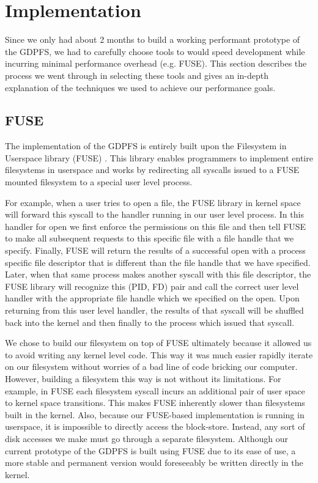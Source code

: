 \documentclass{acm_proc_article-sp}
\begin{document}
\section{Implementation}\label{sec:implementation}

Since we only had about 2 months to build a working performant prototype of the GDPFS, we had to carefully choose tools to would speed development while incurring minimal performance overhead (e.g. FUSE). This section describes the process we went through in selecting these tools and gives an in-depth explanation of the techniques we used to achieve our performance goals.

\subsection{FUSE}   
The implementation of the GDPFS is entirely built upon the Filesystem in Userspace library (FUSE) \cite{FUSE}. This library enables programmers to implement entire filesystems in userspace and works by redirecting all syscalls issued to a FUSE mounted filesystem to a special user level process. 

For example, when a user tries to open a file, the FUSE library in kernel space will forward this syscall to the handler running in our user level process. In this handler for open we first enforce the permissions on this file and then tell FUSE to make all subsequent requests to this specific file with a file handle that we specify. Finally, FUSE will return the results of a successful open with a process specific file descriptor that is different than the file handle that we have specified. Later, when that same process makes another syscall with this file descriptor, the FUSE library will recognize this (PID, FD) pair and call the correct user level handler with the appropriate file handle which we specified on the open. Upon returning from this user level handler, the results of that syscall will be shuffled back into the kernel and then finally to the process which issued that syscall.

We chose to build our filesystem on top of FUSE ultimately because it allowed us to avoid writing any kernel level code. This way it was much easier rapidly iterate on our filesystem without worries of a bad line of code bricking our computer. However, building a filesystem this way is not without its limitations. For example, in FUSE each filesystem syscall incurs an additional pair of user space to kernel space transitions. This makes FUSE inherently slower than filesystems built in the kernel. Also, because our FUSE-based implementation is running in userspace, it is impossible to directly access the block-store. Instead, any sort of disk accesses we make must go through a separate filesystem. Although our current prototype of the GDPFS is built using FUSE due to its ease of use, a more stable and permanent version would foreseeably be written directly in the kernel.
\end{document}
